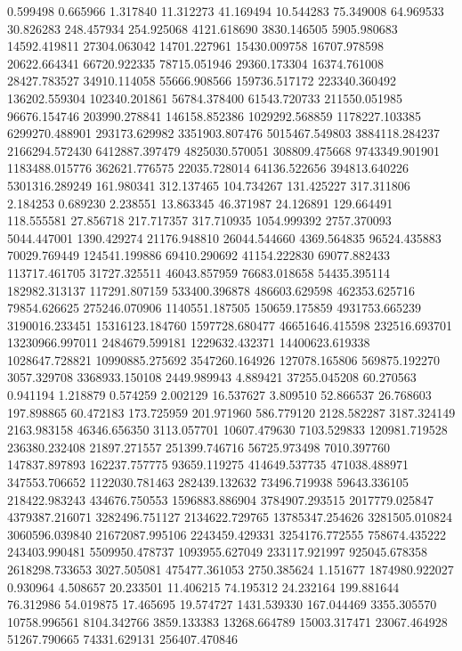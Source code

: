0.599498
0.665966
1.317840
11.312273
41.169494
10.544283
75.349008
64.969533
30.826283
248.457934
254.925068
4121.618690
3830.146505
5905.980683
14592.419811
27304.063042
14701.227961
15430.009758
16707.978598
20622.664341
66720.922335
78715.051946
29360.173304
16374.761008
28427.783527
34910.114058
55666.908566
159736.517172
223340.360492
136202.559304
102340.201861
56784.378400
61543.720733
211550.051985
96676.154746
203990.278841
146158.852386
1029292.568859
1178227.103385
6299270.488901
293173.629982
3351903.807476
5015467.549803
3884118.284237
2166294.572430
6412887.397479
4825030.570051
308809.475668
9743349.901901
1183488.015776
362621.776575
22035.728014
64136.522656
394813.640226
5301316.289249
161.980341
312.137465
104.734267
131.425227
317.311806
2.184253
0.689230
2.238551
13.863345
46.371987
24.126891
129.664491
118.555581
27.856718
217.717357
317.710935
1054.999392
2757.370093
5044.447001
1390.429274
21176.948810
26044.544660
4369.564835
96524.435883
70029.769449
124541.199886
69410.290692
41154.222830
69077.882433
113717.461705
31727.325511
46043.857959
76683.018658
54435.395114
182982.313137
117291.807159
533400.396878
486603.629598
462353.625716
79854.626625
275246.070906
1140551.187505
150659.175859
4931753.665239
3190016.233451
15316123.184760
1597728.680477
46651646.415598
232516.693701
13230966.997011
2484679.599181
1229632.432371
14400623.619338
1028647.728821
10990885.275692
3547260.164926
127078.165806
569875.192270
3057.329708
3368933.150108
2449.989943
4.889421
37255.045208
60.270563
0.941194
1.218879
0.574259
2.002129
16.537627
3.809510
52.866537
26.768603
197.898865
60.472183
173.725959
201.971960
586.779120
2128.582287
3187.324149
2163.983158
46346.656350
3113.057701
10607.479630
7103.529833
120981.719528
236380.232408
21897.271557
251399.746716
56725.973498
7010.397760
147837.897893
162237.757775
93659.119275
414649.537735
471038.488971
347553.706652
1122030.781463
282439.132632
73496.719938
59643.336105
218422.983243
434676.750553
1596883.886904
3784907.293515
2017779.025847
4379387.216071
3282496.751127
2134622.729765
13785347.254626
3281505.010824
3060596.039840
21672087.995106
2243459.429331
3254176.772555
758674.435222
243403.990481
5509950.478737
1093955.627049
233117.921997
925045.678358
2618298.733653
3027.505081
475477.361053
2750.385624
1.151677
1874980.922027
0.930964
4.508657
20.233501
11.406215
74.195312
24.232164
199.881644
76.312986
54.019875
17.465695
19.574727
1431.539330
167.044469
3355.305570
10758.996561
8104.342766
3859.133383
13268.664789
15003.317471
23067.464928
51267.790665
74331.629131
256407.470846
